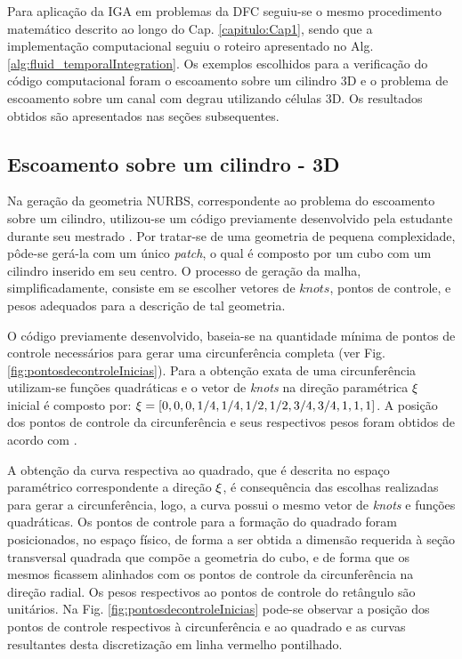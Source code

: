 \documentclass[tese_patricia]{subfiles}
\begin{document}
Para aplicação da IGA em problemas da DFC seguiu-se o mesmo procedimento matemático descrito ao longo do Cap. \ref{capitulo:Cap1}, sendo que a implementação computacional seguiu o roteiro apresentado no Alg. \ref{alg:fluid_temporalIntegration}. Os exemplos escolhidos para a verificação do código computacional foram o escoamento sobre um cilindro 3D e o problema de escoamento sobre um canal com degrau utilizando células 3D. Os resultados obtidos são apresentados nas seções subsequentes.

\subsection {Escoamento sobre um cilindro - 3D}

Na geração da geometria NURBS, correspondente ao problema do escoamento sobre um cilindro, utilizou-se um código previamente desenvolvido pela estudante durante seu mestrado \cite{Tonon:2016}. Por tratar-se de uma geometria de pequena complexidade, pôde-se gerá-la com um único \textit{patch}, o qual é composto por um cubo com um cilindro inserido em seu centro.
O processo de geração da malha, simplificadamente, consiste em se escolher vetores de $knots$, pontos de controle, e pesos adequados para a descrição de tal geometria.

O código previamente desenvolvido, baseia-se na quantidade mínima de pontos de controle necessários para gerar uma circunferência completa (ver Fig. \ref{fig:pontosdecontroleInicias}). Para a obtenção exata de uma circunferência utilizam-se funções quadráticas e o vetor de \textit {knots} na direção paramétrica $\xi$ inicial é composto por: $\xi=\left[0,0,0,1/4,1/4,1/2,1/2,3/4,3/4,1,1,1\right]$. A posição dos pontos de controle da circunferência e seus respectivos pesos foram obtidos de acordo com . 

A obtenção da curva respectiva ao quadrado, que é descrita no espaço paramétrico correspondente a direção $\xi$, é consequência das escolhas realizadas para gerar a circunferência, logo, a curva possui o mesmo vetor de \textit{knots} e funções quadráticas. Os pontos de controle para a formação do quadrado foram posicionados, no espaço físico, de forma a ser obtida a dimensão requerida à seção transversal quadrada que compõe a geometria do cubo, e de forma que os mesmos ficassem alinhados com os pontos de controle da circunferência na direção radial. Os pesos respectivos ao pontos de controle do retângulo são unitários. Na Fig. \ref{fig:pontosdecontroleInicias} pode-se observar a posição dos pontos de controle respectivos à circunferência e ao quadrado e as curvas resultantes desta discretização em linha vermelho pontilhado.
\end{document}

